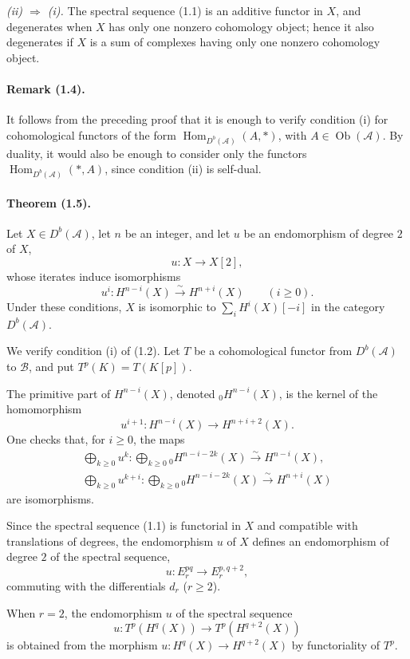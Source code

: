 \documentclass[10pt]{article}
\newcommand{\Acal}{\mathcal A}
\newcommand{\Bcal}{\mathcal B}
\newcommand{\Db}{D^b}
\newcommand{\Hom}{\operatorname{Hom}}
\newcommand{\iso}{\xrightarrow{\sim}}
\begin{document}
\emph{(ii) $\Rightarrow$ (i).} The spectral sequence (1.1) is an additive functor in $X$, and degenerates when $X$ has only one nonzero cohomology object; hence it also degenerates if $X$ is a sum of complexes having only one nonzero cohomology object.

\paragraph{Remark (1.4).} It follows from the preceding proof that it is enough to verify condition (i) for cohomological functors of the form $\Hom_{\Db(\Acal)}(A,*)$, with $A\in\operatorname{Ob}(\Acal)$. By duality, it would also be enough to consider only the functors $\Hom_{\Db(\Acal)}(*,A)$, since condition (ii) is self-dual.

\paragraph{Theorem (1.5).} Let $X\in\Db(\Acal)$, let $n$ be an integer, and let $u$ be an endomorphism of degree $2$ of $X$,
\[
u:X\longrightarrow X[2],
\]
whose iterates induce isomorphisms
\[
u^i:H^{n-i}(X)\iso H^{n+i}(X)\qquad(i\ge0).
\]
Under these conditions, $X$ is isomorphic to $\sum_i H^i(X)[-i]$ in the category $\Db(\Acal)$.

We verify condition (i) of (1.2). Let $T$ be a cohomological functor from $\Db(\Acal)$ to $\Bcal$, and put $T^p(K)=T(K[p])$.

The primitive part of $H^{n-i}(X)$, denoted ${}_0H^{n-i}(X)$, is the kernel of the homomorphism
\[
u^{i+1}:H^{n-i}(X)\longrightarrow H^{n+i+2}(X).
\]
One checks that, for $i\ge0$, the maps
\[
\tag{1.6}
\begin{gathered}
\bigoplus_{k\ge0} u^k:\bigoplus_{k\ge0}{}_0H^{n-i-2k}(X)\iso H^{n-i}(X),\\
\bigoplus_{k\ge0}u^{k+i}:\bigoplus_{k\ge0}{}_0H^{n-i-2k}(X)\iso H^{n+i}(X)
\end{gathered}
\]
are isomorphisms.

Since the spectral sequence (1.1) is functorial in $X$ and compatible with translations of degrees, the endomorphism $u$ of $X$ defines an endomorphism of degree $2$ of the spectral sequence,
\[
u:E_r^{pq}\longrightarrow E_r^{p,q+2},
\]
commuting with the differentials $d_r$ ($r\ge2$).

When $r=2$, the endomorphism $u$ of the spectral sequence
\[
u:T^p(H^q(X))\longrightarrow T^p(H^{q+2}(X))
\]
is obtained from the morphism $u:H^q(X)\to H^{q+2}(X)$ by functoriality of $T^p$.
\end{document}
